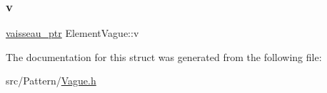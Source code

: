 \mbox{\label{struct_element_vague_a3a5d7caa8fd21beb1634299624271072}} 
\subsubsection{\texorpdfstring{v}{v}}
{\footnotesize\ttfamily \mbox{\hyperlink{def__type_8h_a03925a047830157ad843b4224e7f63ba}{vaisseau\+\_\+ptr}} Element\+Vague\+::v}



The documentation for this struct was generated from the following file\+:\begin{DoxyCompactItemize}
\item 
src/\+Pattern/\mbox{\hyperlink{_vague_8h}{Vague.\+h}}\end{DoxyCompactItemize}
